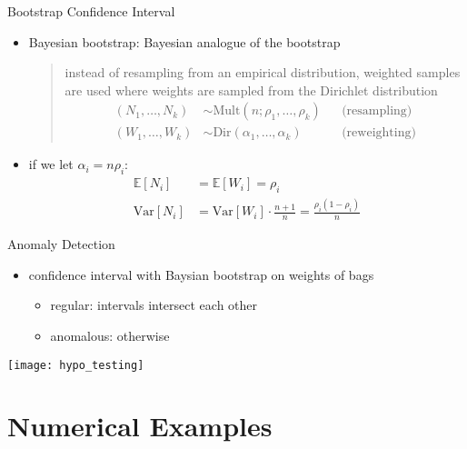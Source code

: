\documentclass[fleqn,aspectratio=1610]{beamer}
\begin{document}
\begin{frame}[label={sec:org8953c0f}]{Bootstrap Confidence Interval}
\begin{itemize}
\item Bayesian bootstrap: Bayesian analogue of the bootstrap
\begin{quote}
  instead of resampling from an empirical distribution,
  weighted samples are used where weights are sampled
  from the Dirichlet distribution
  \begin{align}
    (N_{1},\dotsc,N_{k})
    &\sim \mathrm{Mult}(n;\rho_{1},\dotsc,\rho_{k})
    &&\text{(resampling)}
    \\
    (W_{1},\dotsc,W_{k})
    &\sim \mathrm{Dir}(\alpha_{1},\dotsc,\alpha_{k})
    &&\text{(reweighting)}
  \end{align}
\end{quote}
\item if we let \(\alpha_{i}=n\rho_{i}\):
\begin{align}
  \mathbb{E}[N_{i}]&=\mathbb{E}[W_{i}]=\rho_{i}\\
  \mathrm{Var}[N_{i}]&=\mathrm{Var}[W_{i}]\cdot\frac{n+1}{n}
                     =\frac{\rho_{i}(1-\rho_{i})}{n}
\end{align}
\end{itemize}
\end{frame}

\begin{frame}[label={sec:orgb952bf1}]{Anomaly Detection}
\begin{itemize}
\item confidence interval with Baysian bootstrap on weights of bags
\begin{itemize}
\item \alert{regular:} intervals intersect each other
\item \alert{anomalous:} otherwise
\end{itemize}
\end{itemize}
\begin{center}
\texttt{[image: hypo\_testing]}
\end{center}
\end{frame}


\section{Numerical Examples}
\label{sec:orga262361}
\end{document}
